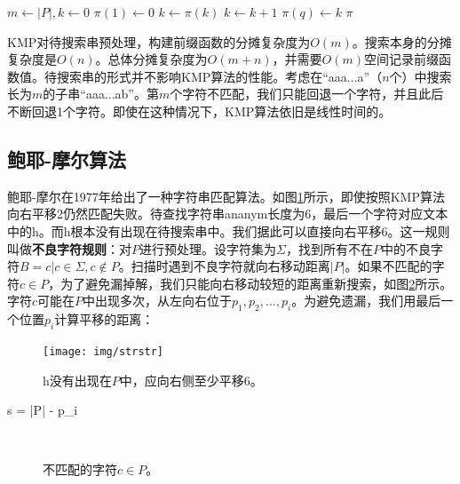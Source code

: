 \documentclass[b5paper]{ctexart}
\begin{document}
\begin{algorithmic}[1]
  \State $m \gets |P|, k \gets 0$
  \State $\pi(1) \gets 0$
      \State $k \gets \pi(k)$
    \EndWhile
      \State $k \gets k + 1$
    \EndIf
    \State $\pi(q) \gets k$
  \EndFor
  \State \Return $\pi$
\EndFunction
\end{algorithmic}

KMP对待搜索串预处理，构建前缀函数的分摊复杂度为$O(m)$\cite{CLRS}。搜索本身的分摊复杂度是$O(n)$。总体分摊复杂度为$O(m + n)$，并需要$O(m)$空间记录前缀函数值。待搜索串的形式并不影响KMP算法的性能。考虑在“aaa...a”（$n$个）中搜索长为$m$的子串“aaa...ab”。第$m$个字符不匹配，我们只能回退一个字符，并且此后不断回退1个字符。即使在这种情况下，KMP算法依旧是线性时间的。


\subsection{鲍耶-摩尔算法}

鲍耶-摩尔在1977年给出了一种字符串匹配算法\cite{boyer-moore}。如图\ref{fig:bad-char}所示，即使按照KMP算法向右平移2仍然匹配失败。待查找字符串ananym长度为6，最后一个字符对应文本中的h。而h根本没有出现在待搜索串中。我们据此可以直接向右平移6。这一规则叫做\textbf{不良字符规则}：对$P$进行预处理。设字符集为$\Sigma$，找到所有不在$P$中的不良字符$B = {c | c \in \Sigma, c \notin P}$。扫描时遇到不良字符就向右移动距离$|P|$。如果不匹配的字符$c \in P$，为了避免漏掉解，我们只能向右移动较短的距离重新搜索，如图\ref{fig:good-char}所示。字符$c$可能在$P$中出现多次，从左向右位于$p_1, p_2, ..., p_i$。为避免遗漏，我们用最后一个位置$p_i$计算平移的距离：

\begin{figure}[htbp]
 \centering
 \texttt{[image: img/strstr]}
 \caption{h没有出现在$P$中，应向右侧至少平移6。}
 \label{fig:bad-char}
\end{figure}

\be
s = |P| - p_i
\label{eqn:BMH-shift}
\ee

\begin{figure}[htbp]
 \centering
  \\
 \caption{不匹配的字符$c \in P$。}
 \label{fig:good-char}
\end{figure}
\end{document}

